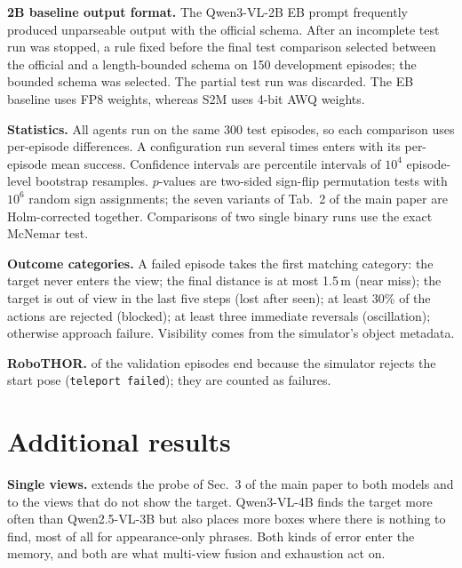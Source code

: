 \documentclass[10pt,twocolumn,letterpaper]{article}
\newcommand{\ours}{S2M\xspace}
\begin{document}
\noindent\textbf{2B baseline output format.}
The Qwen3-VL-2B EB prompt frequently produced unparseable output with the official schema. After an incomplete
test run was stopped, a rule fixed before the final test comparison selected between the official and a
length-bounded schema on 150 development episodes; the bounded schema was selected. The partial test run was
discarded. The EB baseline uses FP8 weights, whereas \ours uses 4-bit AWQ weights.

\noindent\textbf{Statistics.}
All agents run on the same 300 test episodes, so each comparison uses per-episode differences. A configuration run
several times enters with its per-episode mean success. Confidence intervals are percentile intervals of $10^4$
episode-level bootstrap resamples. $p$-values are two-sided sign-flip permutation tests with $10^6$ random sign
assignments; the seven variants of Tab.~2 of the main paper are Holm-corrected together. Comparisons of two single
binary runs use the exact McNemar test.

\noindent\textbf{Outcome categories.}
A failed episode takes the first matching category: the target never enters the view; the final distance is at most
1.5\,m (near miss); the target is out of view in the last five steps (lost after seen); at least 30\% of the actions
are rejected (blocked); at least three immediate reversals (oscillation); otherwise approach failure. Visibility
comes from the simulator's object metadata.

\noindent\textbf{RoboTHOR.}
\nRoboErr{} of the \nRoboN{} validation episodes end because the simulator rejects the start pose
(\texttt{teleport failed}); they are counted as failures.

\section{Additional results}
\label{sec:s-results}

\noindent\textbf{Single views.}
 extends the probe of Sec.~3 of the main paper to both models and to the views that do not show
the target. Qwen3-VL-4B finds the target more often than Qwen2.5-VL-3B but also places more boxes where there is
nothing to find, most of all for appearance-only phrases. Both kinds of error enter the memory, and both are what
multi-view fusion and exhaustion act on.

\begin{table}[t]
\centering\small
\caption{Single-view probe on the test episodes of the first four subsets (start view and the three other 90$^\circ$
headings; 75 views with the target visible per subset).}
\label{tab:s-probe}

\end{table}
\end{document}
